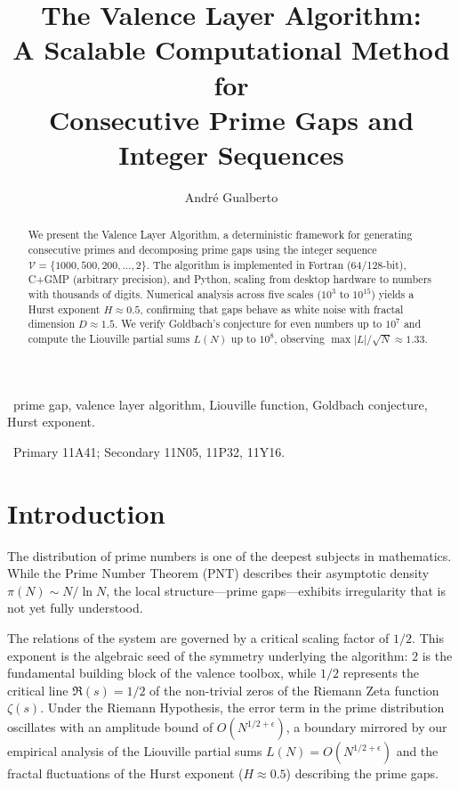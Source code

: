 \documentclass[12pt,a4paper]{article}
\title{The Valence Layer Algorithm:\\A Scalable Computational Method for\\Consecutive Prime Gaps and Integer Sequences}
\author{Andr\'e Gualberto}
\theoremstyle{plain}
\begin{document}
\maketitle

\begin{abstract}
We present the Valence Layer Algorithm, a deterministic framework
for generating consecutive primes and decomposing prime gaps using
the integer sequence $\mathcal{V} = \{1000,500,200,\dots,2\}$.
The algorithm is implemented in Fortran (64/128-bit), C+GMP
(arbitrary precision), and Python, scaling from desktop hardware
to numbers with thousands of digits.  Numerical analysis across
five scales ($10^3$ to $10^{15}$) yields a Hurst exponent
$H\approx0.5$, confirming that gaps behave as white noise with
fractal dimension $D\approx1.5$.  We verify Goldbach's conjecture
for even numbers up to $10^7$ and compute the Liouville partial
sums $L(N)$ up to $10^8$, observing $\max|L|/\sqrt{N}\approx1.33$.
\end{abstract}

\ prime gap, valence layer algorithm,
Liouville function, Goldbach conjecture, Hurst exponent.

\ Primary 11A41;
Secondary 11N05, 11P32, 11Y16.

\section{Introduction}
\label{sec:intro}

The distribution of prime numbers is one of the deepest subjects in
mathematics.  While the Prime Number Theorem (PNT) describes their
asymptotic density $\pi(N)\sim N/\ln N$, the local structure---prime
gaps---exhibits irregularity that is not yet fully understood.

The relations of the system are governed by a critical scaling factor
of $1/2$.  This exponent is the algebraic seed of the symmetry
underlying the algorithm: $2$ is the fundamental building block of
the valence toolbox, while $1/2$ represents the critical line
$\Re(s) = 1/2$ of the non-trivial zeros of the Riemann Zeta function
$\zeta(s)$.  Under the Riemann Hypothesis, the error term in the
prime distribution oscillates with an amplitude bound of
$O(N^{1/2+\epsilon})$, a boundary mirrored by our empirical analysis
of the Liouville partial sums $L(N) = O(N^{1/2+\epsilon})$ and the
fractal fluctuations of the Hurst exponent ($H \approx 0.5$)
describing the prime gaps.
\end{document}

